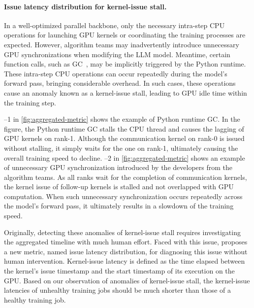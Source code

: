\paragraph{\protect{} Issue latency distribution for kernel-issue stall.}\label{sec:diagnose:issue}
In a well-optimized parallel backbone, only the necessary intra-step CPU operations for launching GPU kernels or coordinating the training processes are expected. However, algorithm teams may inadvertently introduce unnecessary GPU synchronizations when modifying the LLM model. Meantime, certain function calls, such as GC~\cite{jiangMegaScaleScaling,shoeybiMegatronLMTraining}, may be implicitly triggered by the Python runtime. These intra-step CPU operations can occur repeatedly during the model’s forward pass, bringing considerable overhead. In such cases, these operations cause an anomaly known as a kernel-issue stall, leading to GPU idle time within the training step.

\protect{}--1 in \autoref{fig:aggregated-metric} shows the example of Python runtime GC.
In the figure, the Python runtime GC stalls the CPU thread and causes the lagging of GPU kernels on rank-1.
Although the communication kernel on rank-0 is issued without stalling, it simply waits for the one on rank-1, ultimately causing the overall training speed to decline.
\protect{}--2 in \autoref{fig:aggregated-metric} shows an example of unnecessary GPU synchronization introduced by the developers from the algorithm teams.
As all ranks wait for the completion of communication kernels, the kernel issue of follow-up kernels is stalled and not overlapped with GPU computation.
When such unnecessary synchronization occurs repeatedly across the model’s forward pass, it ultimately results in a slowdown of the training speed.

Originally, detecting these anomalies of kernel-issue stall requires investigating the aggregated timeline with much human effort.
Faced with this issue, \sysname{} proposes a new metric, named issue latency distribution, for diagnosing this issue without human intervention.
Kernel-issue latency is defined as the time elapsed between the kernel’s issue timestamp and the start timestamp of its execution on the GPU.
Based on our observation of anomalies of kernel-issue stall, the kernel-issue latencies of unhealthy training jobs should be much shorter than those of a healthy training job.

